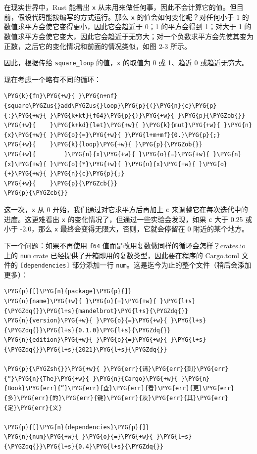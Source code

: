 在现实世界中，Rust 能看出 \texttt{x} 从未用来做任何事，因此不会计算它的值。但目前，假设代码能按编写的方式运行。那么 \texttt{x} 的值会如何变化呢？对任何小于 1 的数值求平方会使它变得更小，因此它会趋近于 0；1 的平方会得到 1；对大于 1 的数值求平方会使它变大，因此它会趋近于无穷大；对一个负数求平方会先使其变为正数，之后它的变化情况和前面的情况类似，如图 2-3 所示。


因此，根据传给 \texttt{square\_loop} 的值，\texttt{x} 的取值为 0 或 1、趋近 0 或趋近无穷大。

现在考虑一个略有不同的循环：

\begin{Verbatim}[commandchars=\\\{\},breaklines=true,breakanywhere=true,fontsize=\codefont,xleftmargin=17bp]
\PYG{k}{fn}\PYG{+w}{ }\PYG{n+nf}{square\PYGZus{}add\PYGZus{}loop}\PYG{p}{(}\PYG{n}{c}\PYG{p}{:}\PYG{+w}{ }\PYG{k+kt}{f64}\PYG{p}{)}\PYG{+w}{ }\PYG{p}{\PYGZob{}}
\PYG{+w}{    }\PYG{k+kd}{let}\PYG{+w}{ }\PYG{k}{mut}\PYG{+w}{ }\PYG{n}{x}\PYG{+w}{ }\PYG{o}{=}\PYG{+w}{ }\PYG{l+m+mf}{0.}\PYG{p}{;}
\PYG{+w}{    }\PYG{k}{loop}\PYG{+w}{ }\PYG{p}{\PYGZob{}}
\PYG{+w}{        }\PYG{n}{x}\PYG{+w}{ }\PYG{o}{=}\PYG{+w}{ }\PYG{n}{x}\PYG{+w}{ }\PYG{o}{*}\PYG{+w}{ }\PYG{n}{x}\PYG{+w}{ }\PYG{o}{+}\PYG{+w}{ }\PYG{n}{c}\PYG{p}{;}
\PYG{+w}{    }\PYG{p}{\PYGZcb{}}
\PYG{p}{\PYGZcb{}}
\end{Verbatim}

这一次，\texttt{x} 从 0 开始，我们通过对它求平方后再加上 \texttt{c} 来调整它在每次迭代中的进度。这更难看出 \texttt{x} 的变化情况了，但通过一些实验会发现，如果 \texttt{c} 大于 0.25 或小于 -2.0，那么 \texttt{x} 最终会变得无限大，否则，它就会停留在 0 附近的某个地方。

下一个问题：如果不再使用 \texttt{f64} 值而是改用复数做同样的循环会怎样？crates.io 上的 \texttt{num} crate 已经提供了开箱即用的复数类型，因此要在程序的 Cargo.toml 文件的 \texttt{[dependencies]} 部分添加一行 \texttt{num}。这是迄今为止的整个文件（稍后会添加更多）：

\begin{Verbatim}[commandchars=\\\{\},breaklines=true,breakanywhere=true,fontsize=\codefont,xleftmargin=17bp]
\PYG{p}{[}\PYG{n}{package}\PYG{p}{]}
\PYG{n}{name}\PYG{+w}{ }\PYG{o}{=}\PYG{+w}{ }\PYG{l+s}{\PYGZdq{}}\PYG{l+s}{mandelbrot}\PYG{l+s}{\PYGZdq{}}
\PYG{n}{version}\PYG{+w}{ }\PYG{o}{=}\PYG{+w}{ }\PYG{l+s}{\PYGZdq{}}\PYG{l+s}{0.1.0}\PYG{l+s}{\PYGZdq{}}
\PYG{n}{edition}\PYG{+w}{ }\PYG{o}{=}\PYG{+w}{ }\PYG{l+s}{\PYGZdq{}}\PYG{l+s}{2021}\PYG{l+s}{\PYGZdq{}}

\PYG{p}{\PYGZsh{}}\PYG{+w}{ }\PYG{err}{请}\PYG{err}{到}\PYG{err}{“}\PYG{n}{The}\PYG{+w}{ }\PYG{n}{Cargo}\PYG{+w}{ }\PYG{n}{Book}\PYG{err}{”}\PYG{err}{查}\PYG{err}{看}\PYG{err}{更}\PYG{err}{多}\PYG{err}{的}\PYG{err}{键}\PYG{err}{及}\PYG{err}{其}\PYG{err}{定}\PYG{err}{义}

\PYG{p}{[}\PYG{n}{dependencies}\PYG{p}{]}
\PYG{n}{num}\PYG{+w}{ }\PYG{o}{=}\PYG{+w}{ }\PYG{l+s}{\PYGZdq{}}\PYG{l+s}{0.4}\PYG{l+s}{\PYGZdq{}}
\end{Verbatim}

